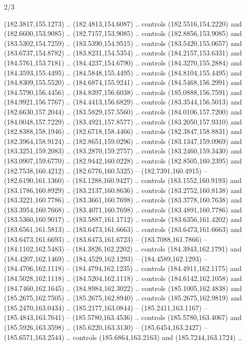 \begin{flagdescription}{2/3}
\begin{scope}[xshift=0.5\flaglength,yshift=0.5\flagwidth,scale=\flagwidth/180]
\begin{scope}[y=0.8pt, x=0.8pt, yscale=-1,shift={(-168.75,-108.75)}]
  (182.3817,155.1273) .. (182.4813,154.6087) .. controls (182.5516,154.2220) and
  (182.6600,153.9085) .. (182.7157,153.9085) .. controls (182.8856,153.9085) and
  (183.5302,154.7259) .. (183.5390,154.9515) .. controls (183.5420,155.0657) and
  (183.6737,154.8782) .. (183.8231,154.5354) .. controls (184.2157,153.6331) and
  (184.5761,153.7181) .. (184.4237,154.6790) .. controls (184.3270,155.2884) and
  (184.3593,155.4495) .. (184.5848,155.4495) .. controls (184.8104,155.4495) and
  (184.8309,155.5520) .. (184.6874,155.9241) .. controls (184.5468,156.2991) and
  (184.5790,156.4456) .. (184.8397,156.6038) .. controls (185.0888,156.7591) and
  (184.9921,156.7767) .. (184.4413,156.6829) .. controls (183.3544,156.5013) and
  (182.6630,157.2044) .. (183.5829,157.5560) .. controls (184.0106,157.7200) and
  (184.0048,157.7229) .. (183.4921,157.8577) .. controls (183.2050,157.9310) and
  (182.8388,158.1946) .. (182.6718,158.4466) .. controls (182.3847,158.8831) and
  (182.3964,158.9124) .. (182.8651,159.0296) .. controls (183.1347,159.0969) and
  (183.3251,159.2083) .. (183.2870,159.2757) .. controls (183.2460,159.3430) and
  (183.0907,159.6770) .. (182.9442,160.0228) .. controls (182.8505,160.2395) and
  (182.7538,160.4212) .. (182.6776,160.5325) -- (182.7391,160.4915) --
  (182.6190,161.1360) -- (183.1288,160.9427) .. controls (183.1552,160.9193) and
  (183.1786,160.8929) .. (183.2137,160.8636) .. controls (183.2752,160.8138) and
  (183.3221,160.7786) .. (183.3661,160.7698) .. controls (183.3778,160.7638) and
  (183.3954,160.7668) .. (183.4071,160.7698) .. controls (183.4891,160.7786) and
  (183.5360,160.9017) .. (183.5887,161.1712) .. controls (183.6356,161.4202) and
  (183.6561,161.5813) .. (183.6473,161.6663) .. controls (183.6473,161.6663) and
  (183.6473,161.6693) .. (183.6473,161.6723) -- (183.7088,161.7866) --
  (184.1102,162.5483) -- (184.3826,162.2202) .. controls (184.3943,162.1791) and
  (184.4207,162.1469) .. (184.4529,162.1293) -- (184.4589,162.1293) --
  (184.4706,162.1118) -- (184.4794,162.1235) .. controls (184.4911,162.1175) and
  (184.5028,162.1118) .. (184.5204,162.1118) .. controls (184.6142,162.1058) and
  (184.7460,162.1645) .. (184.8984,162.3022) .. controls (185.1005,162.4838) and
  (185.2675,162.7505) .. (185.2675,162.8940) .. controls (185.2675,162.9819) and
  (185.2470,163.0434) .. (185.2177,163.0844) -- (185.2411,163.1167) --
  (185.4843,163.7641) -- (185.5780,163.4536) .. controls (185.5780,163.4067) and
  (185.5926,163.3598) .. (185.6220,163.3130) -- (185.6454,163.2427) --
  (185.6571,163.2544) .. controls (185.6864,163.2163) and (185.7244,163.1724) ..

\end{scope}
\end{scope}
\end{flagdescription}

